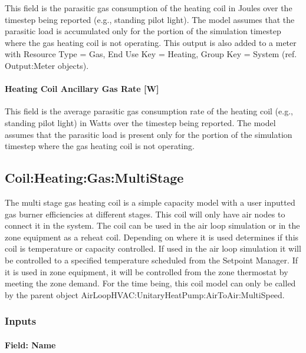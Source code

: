 This field is the parasitic gas consumption of the heating coil in Joules over the timestep being reported (e.g., standing pilot light). The model assumes that the parasitic load is accumulated only for the portion of the simulation timestep where the gas heating coil is not operating. This output is also added to a meter with Resource Type = Gas, End Use Key = Heating, Group Key = System (ref. Output:Meter objects).

\paragraph{Heating Coil Ancillary Gas Rate {[}W{]}}\label{heating-coil-ancillary-gas-rate-w}

This field is the average parasitic gas consumption rate of the heating coil (e.g., standing pilot light) in Watts over the timestep being reported. The model assumes that the parasitic load is present only for the portion of the simulation timestep where the gas heating coil is not operating.

\subsection{Coil:Heating:Gas:MultiStage}\label{coilheatinggasmultistage}

The multi stage gas heating coil is a simple capacity model with a user inputted gas burner efficiencies at different stages. This coil will only have air nodes to connect it in the system. The coil can be used in the air loop simulation or in the zone equipment as a reheat coil. Depending on where it is used determines if this coil is temperature or capacity controlled. If used in the air loop simulation it will be controlled to a specified temperature scheduled from the Setpoint Manager. If it is used in zone equipment, it will be controlled from the zone thermostat by meeting the zone demand. For the time being, this coil model can only be called by the parent object AirLoopHVAC:UnitaryHeatPump:AirToAir:MultiSpeed.

\subsubsection{Inputs}\label{inputs-11-005}

\paragraph{Field: Name}\label{field-name-10-005}

